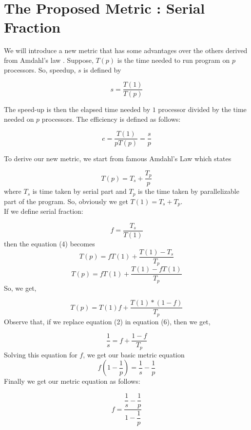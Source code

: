 \section{The Proposed Metric : Serial Fraction}

We will introduce a new metric that has some advantages over the others derived from Amdahl's law \cite{amdahl}. Suppose, 
$T(p)$ is the time needed to run program on $p$ processors. So, speedup, $s$ is defined by


\begin{equation}
s = \dfrac{T(1)}{T(p)}
\end{equation}

The speed-up is then the elapsed time needed by $1$ processor divided by the time needed on $p$ processors.
The efficiency  is defined as follows:

\begin{equation}
e
  = \dfrac{T(1)}{pT(p)}= \dfrac{s}{p}
\end{equation}

To derive our new metric, we start from famous Amdahl's Law which states

\begin{equation}
T(p)= T_s + {\dfrac{T_p}{p}}
\end{equation}
where $T_s$ is time taken by serial part and $T_p$ is the time taken by parallelizable part of the program. So, obviously we get $T(1) = T_s + T_p$.
\\If we define serial fraction:

\begin{equation}
f
  = \dfrac{T_s}{T(1)}
\end{equation}
then the equation (4) becomes
\[T(p)= fT(1)+{\dfrac{T(1)-T_s}{T_p}}
\]
\[T(p)= fT(1)+{\dfrac{T(1)-fT(1)}{T_p}}
\]
So, we get,

\begin{equation}
T(p)=T(1)f+\dfrac{T(1)*(1-f)}{T_p}
\end{equation}
Observe that, if we replace equation (2) in equation (6), then we get,


\begin{equation}
\dfrac{1}{s} = f + \dfrac{1-f}{T_p}
\end{equation}
Solving this equation for $f$, we get our basic metric equation
\[f(1-\dfrac{1}{p})
  = \dfrac{1}{s}-\dfrac{1}{p}
\]
Finally we get our metric equation as follows:

\begin{equation}
f
  = \dfrac{\dfrac{1}{s}-\dfrac{1}{p}}{1-\dfrac{1}{p}}
\end{equation}


